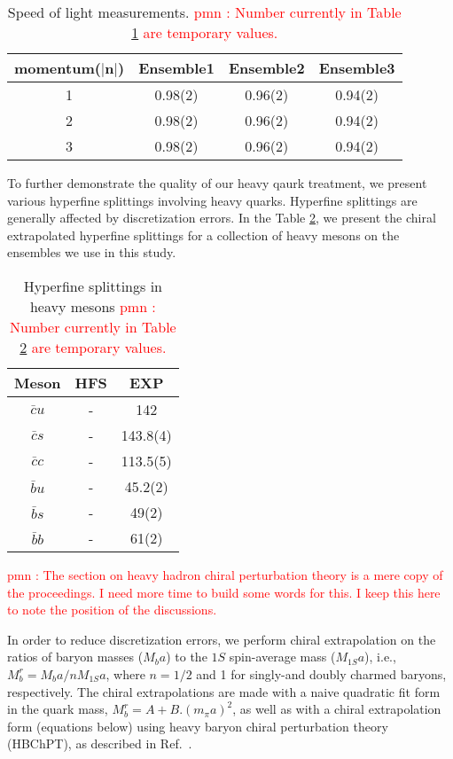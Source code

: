 \documentclass[showkeys,aps,10pt,twocolumn,showpacs,preprintnumbers,amsmath,amssymb,prd,letterpaper,floatfix,nofootinbib,superscriptaddress,]{revtex4-1}
\newcommand\bet{\begin{table}}
\newcommand\eet[1]{\label{tb:#1}\end{table}}
\newcommand\tbn[1]{Table \ref{tb:#1}}
\newcommand\pmn[1]{\textcolor{red}{pmn : #1}}
\begin{document}
\bet[h]
\centering
\begin{tabular}{c|c|c|c}
\hline
\hline
momentum($|{\mathbf{n}}|$) & Ensemble1 & Ensemble2 & Ensemble3 \\
\hline
1 & 0.98(2) & 0.96(2) & 0.94(2) \\
2 & 0.98(2) & 0.96(2) & 0.94(2) \\
3 & 0.98(2) & 0.96(2) & 0.94(2) \\
\hline
\end{tabular}
\caption{Speed of light measurements. \pmn{Number currently in \tbn{speedlight} are temporary values.}}
\eet{speedlight}

To further demonstrate the quality of our heavy qaurk treatment, we present various hyperfine 
splittings involving heavy quarks. Hyperfine splittings are generally affected by discretization 
errors. In the \tbn{hfsmesons}, we present the chiral extrapolated hyperfine splittings for 
a collection of heavy mesons on the ensembles we use in this study. 

\bet[h]
\centering
\begin{tabular}{c|c|c}
\hline
\hline
Meson     & HFS & EXP        \\
\hline
$\bar cu$ &  -  & 142        \\ 
$\bar cs$ &  -  & 143.8(4)   \\
$\bar cc$ &  -  & 113.5(5)   \\
$\bar bu$ &  -  & 45.2(2)    \\ 
$\bar bs$ &  -  & 49(2)      \\
$\bar bb$ &  -  & 61(2)      \\
\hline
\end{tabular}
\caption{Hyperfine splittings in heavy mesons \pmn{Number currently in \tbn{hfsmesons} are temporary values.}}
\eet{hfsmesons}

\pmn{The section on heavy hadron chiral perturbation theory is a mere copy of the proceedings. 
I need more time to build some words for this. I keep this here to note the position of the discussions.}

In order to reduce discretization errors, we perform chiral extrapolation on the ratios of 
baryon masses ($M_ba$) to the $1S$ spin-average mass ($M_{1S}a$), i.e., $M_b^r = M_ba/nM_{1S}a$, 
where $n = 1/2$ and 1 for singly-and doubly charmed baryons, respectively. The chiral 
extrapolations are made with a naive quadratic fit form in the quark mass, $M_b^r = A+B.(m_{\pi}a)^2$, 
as well as with a chiral extrapolation form (equations below) using heavy baryon chiral 
perturbation theory (HBChPT), as described in Ref.~\cite{Briceno:2012wt}.
\end{document}
